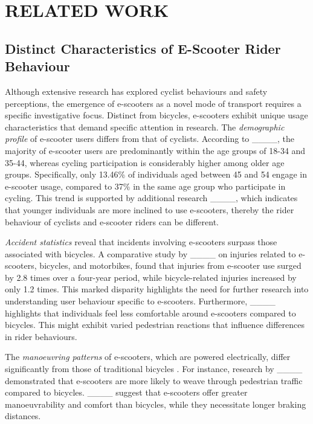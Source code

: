 \section{RELATED WORK}
\subsection{Distinct Characteristics of E-Scooter Rider Behaviour}

Although extensive research has explored cyclist behaviours and safety perceptions, the emergence of e-scooters as a novel mode of transport requires a specific investigative focus. Distinct from bicycles, e-scooters exhibit unique usage characteristics that demand specific attention in research. The \textit{demographic profile} of e-scooter users differs from that of cyclists. According to ____, the majority of e-scooter users are predominantly within the age groups of 18-34 and 35-44, whereas cycling participation is considerably higher among older age groups. Specifically, only 13.46\% of individuals aged between 45 and 54 engage in e-scooter usage, compared to 37\% in the same age group who participate in cycling. This trend is supported by additional research ____, which indicates that younger individuals are more inclined to use e-scooters, thereby the rider behaviour of cyclists and e-scooter riders can be different.

\textit{Accident statistics} reveal that incidents involving e-scooters surpass those associated with bicycles. A comparative study by ____ on injuries related to e-scooters, bicycles, and motorbikes, found that injuries from e-scooter use surged by 2.8 times over a four-year period, while bicycle-related injuries increased by only 1.2 times. This marked disparity highlights the need for further research into understanding user behaviour specific to e-scooters. Furthermore, ____ highlights that individuals feel less comfortable around e-scooters compared to bicycles. This might exhibit varied pedestrian reactions that influence differences in rider behaviours.

The \textit{manoeuvring patterns} of e-scooters, which are powered electrically, differ significantly from those of traditional bicycles \cite {10.1145/3313831.3376499}. For instance, research by ____ demonstrated that e-scooters are more likely to weave through pedestrian traffic compared to bicycles. ____ suggest that e-scooters offer greater manoeuvrability and comfort than bicycles, while they necessitate longer braking distances.

